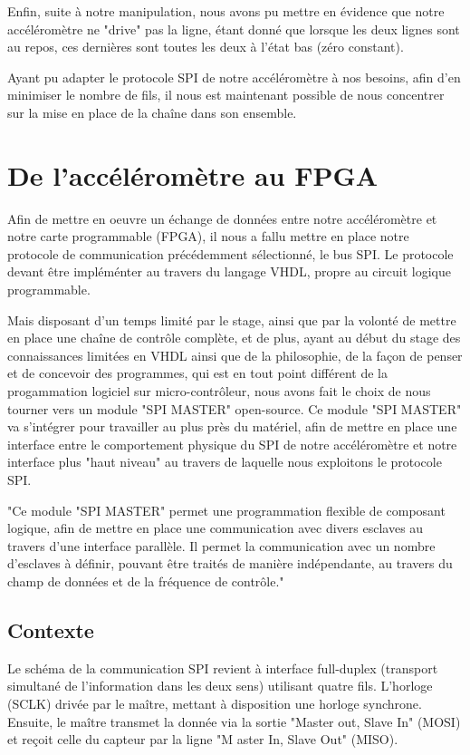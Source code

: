\documentclass[french,a4paper,12pt]{report}
\begin{document}
	Enfin, suite à notre manipulation, nous avons pu mettre en évidence que notre accéléromètre ne "drive" pas la ligne, étant donné que lorsque les deux lignes sont au repos, ces dernières sont toutes les deux à l'état bas (zéro constant).
	
	Ayant pu adapter le protocole SPI de notre accéléromètre à nos besoins, afin d'en minimiser le nombre de fils, il nous est maintenant possible de nous concentrer sur la mise en place de la chaîne dans son ensemble.
	
	\chapter{De l'accéléromètre au FPGA}
	
		Afin de mettre en oeuvre un échange de données entre notre accéléromètre et notre carte programmable (FPGA), il nous a fallu mettre en place notre protocole de communication précédemment sélectionné, le bus SPI. Le protocole devant être impléménter au travers du langage VHDL, propre au circuit logique programmable.
		
		Mais disposant d'un temps limité par le stage, ainsi que par la volonté de mettre en place une chaîne de contrôle complète, et de plus, ayant au début du stage des connaissances limitées en VHDL ainsi que de la philosophie, de la façon de penser et de concevoir des programmes, qui est en tout point différent de la progammation logiciel sur micro-contrôleur, nous avons fait le choix de nous tourner vers un module "SPI MASTER" open-source.		
		Ce module "SPI MASTER" va s'intégrer pour travailler au plus près du matériel, afin de mettre en place une interface entre le comportement physique du SPI de notre accéléromètre et notre interface plus "haut niveau" au travers de laquelle nous exploitons le protocole SPI.
		
		"Ce module "SPI MASTER" permet une programmation flexible de composant logique, afin de mettre en place une communication avec divers esclaves au travers d'une interface parallèle. Il permet la communication avec un nombre d'esclaves à définir, pouvant être traités de manière indépendante, au travers du champ de données et de la fréquence de contrôle."
		
		\section{Contexte}
			Le schéma de la communication SPI revient à interface full-duplex (transport simultané de l'information dans les deux sens) utilisant quatre fils. L'horloge (SCLK) drivée par le maître, mettant à disposition une horloge synchrone. Ensuite, le maître transmet la donnée via la sortie "Master out, Slave In" (MOSI) et reçoit celle du capteur par la ligne "M	aster In, Slave Out" (MISO).
			
\end{document}

